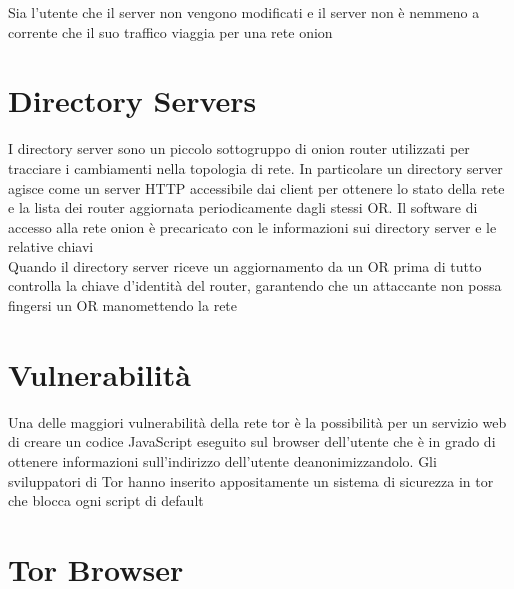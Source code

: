 Sia l'utente che il server non vengono modificati e il server non è nemmeno a corrente che il suo traffico viaggia per una rete onion \cite{ChaumMixes}

\section{Directory Servers}
I directory server sono un piccolo sottogruppo di onion router utilizzati per tracciare i cambiamenti nella topologia di rete. In particolare un directory server agisce come un server HTTP accessibile dai client per ottenere lo stato della rete e la lista dei router aggiornata periodicamente dagli stessi OR. Il software di accesso alla rete onion è precaricato con le informazioni sui directory server e le relative chiavi \\
Quando il directory server riceve un aggiornamento da un OR prima di tutto controlla la chiave d'identità del router, garantendo che un attaccante non possa fingersi un OR manomettendo la rete \cite{ChaumMixes}

\section{Vulnerabilità} %
Una delle maggiori vulnerabilità della rete tor è la possibilità per un servizio web di creare un codice JavaScript eseguito sul browser dell'utente che è in grado di ottenere informazioni sull'indirizzo dell'utente deanonimizzandolo. Gli sviluppatori di Tor hanno inserito appositamente un sistema di sicurezza in tor che blocca ogni script di default

\section{Tor Browser}
